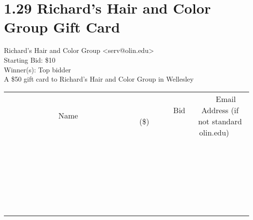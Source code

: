 \documentclass[11pt]{article}
\begin{document}
					\section*{1.29 Richard's Hair and Color Group Gift Card}
					Richard's Hair and Color Group <serv@olin.edu> \\
					Starting Bid: \$10 \\
					Winner(s): Top bidder \\
					A \$50 gift card to Richard's Hair and Color Group in Wellesley \\
					[6ex]
					\begin{tabular}{c c c}
						~~~~~~~~~~~~~Name~~~~~~~~~~~~~ & ~~~~~~~~~Bid (\$)~~~~~~~~~ & ~~~Email Address (if not standard olin.edu)~~~ \\
				
 & & \\
\hline
 & & \\
\hline
 & & \\
\hline
 & & \\
\hline
 & & \\
\hline
 & & \\
\hline
 & & \\
\hline
 & & \\
\hline
 & & \\
\hline
 & & \\
\hline
 & & \\
\hline
 & & \\
\hline
 & & \\
\hline
 & & \\
\hline
 & & \\
\hline
 & & \\
\hline
 & & \\
\hline
 & & \\
\hline
 & & \\
\hline
 & & \\
\hline
 & & \\
\hline
 & & \\
\hline
 & & \\
\hline
 & & \\
\hline
 & & \\
\hline
 & & \\
\hline
					\end{tabular}
					\clearpage
				
\end{document}
